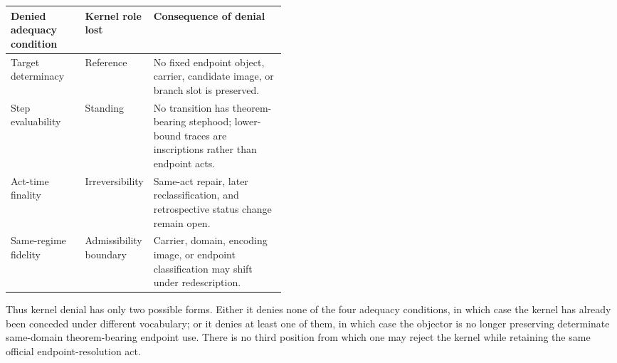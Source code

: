 \documentclass[11pt]{article}
\theoremstyle{definition}
\theoremstyle{remark}
\begin{document}
\begin{center}
\small
\begin{tabularx}{\linewidth}{>{\raggedright\arraybackslash}p{0.27\linewidth}>{\raggedright\arraybackslash}p{0.18\linewidth}X}
\toprule
Denied adequacy condition & Kernel role lost & Consequence of denial \\
\midrule
Target determinacy & Reference & No fixed endpoint object, carrier, candidate image, or branch slot is preserved. \\
Step evaluability & Standing & No transition has theorem-bearing stephood; lower-bound traces are inscriptions rather than endpoint acts. \\
Act-time finality & Irreversibility & Same-act repair, later reclassification, and retrospective status change remain open. \\
Same-regime fidelity & Admissibility boundary & Carrier, domain, encoding image, or endpoint classification may shift under redescription. \\
\bottomrule
\end{tabularx}
\end{center}

Thus kernel denial has only two possible forms. Either it denies none of the four adequacy conditions, in which case the kernel has already been conceded under different vocabulary; or it denies at least one of them, in which case the objector is no longer preserving determinate same-domain theorem-bearing endpoint use. There is no third position from which one may reject the kernel while retaining the same official endpoint-resolution act.
\end{document}
